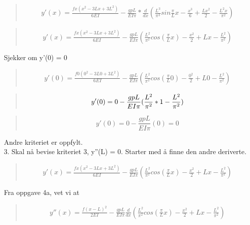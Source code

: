 \begin{quote}
\begin{multline*}
y'(x) = \frac{fx(x^2-3Lx+3L^2)}{6EI} - \frac{gpL}{EI\pi}*\frac{d}{dx} (\frac{L^3}{\pi^3} sin \frac{\pi}{L}x - \frac{x^3}{6} + \frac{Lx^2}{2} - \frac{L^2x}{\pi^2})
\end{multline*}
\end{quote}

\begin{quote}
\begin{multline*}
y'(x) = \frac{fx(x^2-3Lx+3L^2)}{6EI} - \frac{gpL}{EI\pi} (\frac{L^2}{\pi^2} cos(\frac{\pi}{L}x) - \frac{x^2}{2} + Lx - \frac{L^2}{\pi^2})
\end{multline*}
\end{quote}
Sjekker om y'(0) = 0
\begin{quote}
\begin{multline*}
y'(0) = \frac{f0(0^2-3L0+3L^2)}{6EI} - \frac{gpL}{EI\pi} (\frac{L^2}{\pi^2} cos(\frac{\pi}{L}0) - \frac{0^2}{2} + L0 - \frac{L^2}{\pi^2})
\end{multline*}
\end{quote}

\begin{quote}
\begin{equation*}
y'(0) = 0 - \frac{gpL}{EI\pi} (\frac{L^2}{\pi^2} * 1 -\frac{L^2}{\pi^2}) \\
\end{equation*}
\end{quote}

\begin{quote}
\begin{equation*}
y'(0) = 0 - \frac{gpL}{EI\pi} (0) = 0
\end{equation*}
\end{quote}
Andre kriteriet er oppfylt.
\\
3. Skal nå bevise kriteriet 3, y''(L) = 0. Starter med å finne den andre deriverte.
\begin{quote}
\begin{multline*}
y'(x) = \frac{fx(x^2-3Lx+3L^2)}{6EI} - \frac{gpL}{EI\pi} (\frac{L^2}{\pi^2} cos(\frac{\pi}{L}x) - \frac{x^2}{2} + Lx - \frac{L^2}{\pi^2})
\end{multline*}
\end{quote}
Fra oppgave 4a, vet vi at
\begin{quote}
\begin{multline*}
y''(x) = \frac{f(x-L)^2}{2EI} - \frac{gpL}{EI\pi} \frac{d}{dx}(\frac{L^2}{\pi^2} cos(\frac{\pi}{L}x) - \frac{x^2}{2} + Lx - \frac{L^2}{\pi^2})
\end{multline*}
\end{quote}

